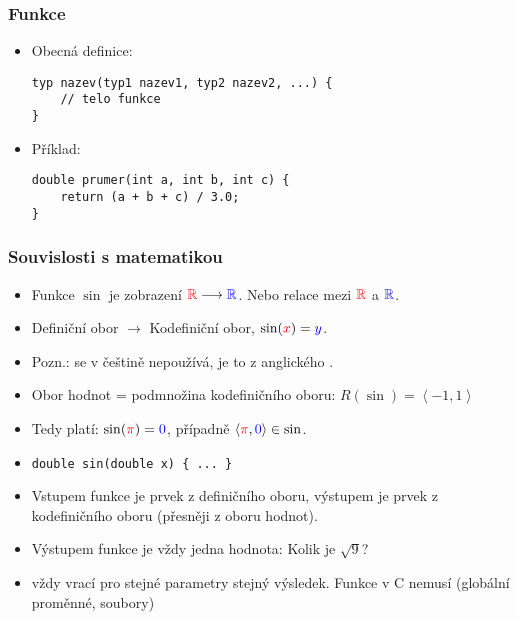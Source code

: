 \documentclass{beamer}
\newenvironment{itemizex}%
  {\large \begin{itemize}%
    \setlength{\itemsep}{8pt}%
    \setlength{\parskip}{8pt}}%
  {\end{itemize}}
\begin{document}
\begin{frame}[t,fragile]\frametitle{Funkce} 
\begin{itemizex}
    \item Obecná definice:
    \begin{verbatim} 
typ nazev(typ1 nazev1, typ2 nazev2, ...) {
    // telo funkce
}
    \end{verbatim}
    \item Příklad:
    \begin{verbatim} 
double prumer(int a, int b, int c) {
    return (a + b + c) / 3.0;
}
    \end{verbatim}
\end{itemizex}
\end{frame}


\begin{frame}[t,fragile]\frametitle{Souvislosti s matematikou} 
    \begin{itemize}
        \item Funkce $\sin$ je zobrazení ${\color{red}\mathbb{R}}\longrightarrow{\color{blue}\mathbb{R}}$. Nebo relace mezi ${\color{red}\mathbb{R}}$ a ${\color{blue}\mathbb{R}}$. 
        \item {\color{red} Definiční obor} $\longrightarrow$ {\color{blue} Kodefiniční obor}, $\sin ({\color{red}x}) = {\color{blue}y}$. 
        \item {\tiny Pozn.:  se v češtině nepoužívá, je to z anglického .}
        \item {\color{blue} Obor hodnot} = podmnožina kodefiničního oboru: $R(\sin)=\left<-1, 1\right>$
        \item Tedy platí: $\sin({\color{red}\pi}) = {\color{blue}0}$, případně $\left<{\color{red}\pi}, {\color{blue}0}\right>\in\sin$.
        \item \texttt{{\color{blue}double} sin({\color{red}double x}) \{ ... \}}
        \item Vstupem funkce je prvek z definičního oboru, výstupem je prvek z kodefiničního oboru (přesněji z oboru hodnot).
        \item Výstupem funkce je vždy jedna hodnota: Kolik je $\sqrt{9}$?
        \item {} vždy vrací pro stejné parametry stejný výsledek. Funkce v C nemusí (globální proměnné, soubory)
    \end{itemize}
\end{frame}
\end{document}
